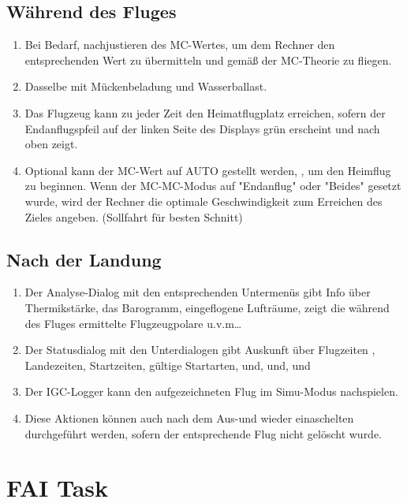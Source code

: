 \subsection*{Während des Fluges}
\begin{enumerate}
\item  Bei Bedarf, nachjustieren des MC-Wertes, um dem Rechner den entsprechenden Wert zu übermitteln und gemäß der MC-Theorie zu fliegen.
\item  Dasselbe mit Mückenbeladung  und Wasserballast.
\item  Das Flugzeug kann zu jeder Zeit den Heimatflugplatz erreichen, sofern der Endanflugspfeil auf der linken Seite des Displays grün erscheint und nach oben zeigt.
\item  Optional kann der MC-Wert auf AUTO gestellt werden, , um den Heimflug zu beginnen.
Wenn der MC-MC-Modus auf "Endanflug" oder "Beides" gesetzt wurde, wird der
Rechner die optimale Geschwindigkeit zum Erreichen des Zieles angeben. (Sollfahrt für besten Schnitt)
\end{enumerate}

\subsection*{Nach der Landung}

\begin{enumerate}
\item  Der Analyse-Dialog  mit den entsprechenden Untermenüs gibt Info über Thermikstärke, das Barogramm,
eingeflogene Lufträume, zeigt die während des Fluges ermittelte Flugzeugpolare u.v.m\dots
\item  Der Statusdialog   mit den Unterdialogen gibt Auskunft über Flugzeiten , Landezeiten, Startzeiten,
          gültige Startarten, und, und, und
\item   Der IGC-Logger kann den aufgezeichneten Flug im Simu-Modus nachspielen.
\item  Diese Aktionen können auch nach dem Aus-und wieder einaschelten durchgeführt werden, sofern der entsprechende Flug nicht gelöscht wurde.
\end{enumerate}

\section{FAI Task}\label{sec:fai-task}

